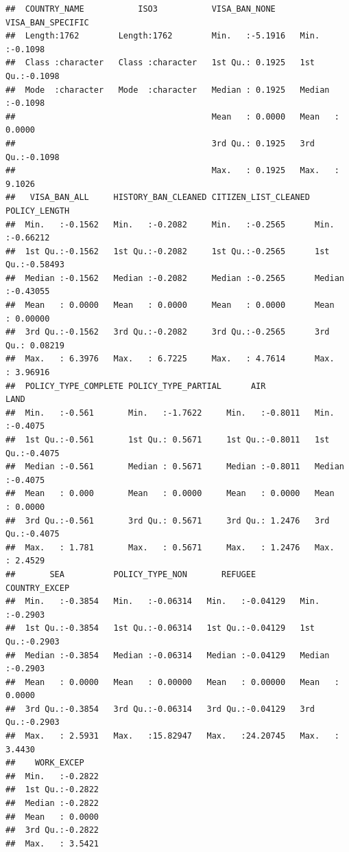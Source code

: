 \documentclass[]{article}
\begin{document}
\begin{verbatim}
##  COUNTRY_NAME           ISO3           VISA_BAN_NONE     VISA_BAN_SPECIFIC
##  Length:1762        Length:1762        Min.   :-5.1916   Min.   :-0.1098  
##  Class :character   Class :character   1st Qu.: 0.1925   1st Qu.:-0.1098  
##  Mode  :character   Mode  :character   Median : 0.1925   Median :-0.1098  
##                                        Mean   : 0.0000   Mean   : 0.0000  
##                                        3rd Qu.: 0.1925   3rd Qu.:-0.1098  
##                                        Max.   : 0.1925   Max.   : 9.1026  
##   VISA_BAN_ALL     HISTORY_BAN_CLEANED CITIZEN_LIST_CLEANED POLICY_LENGTH     
##  Min.   :-0.1562   Min.   :-0.2082     Min.   :-0.2565      Min.   :-0.66212  
##  1st Qu.:-0.1562   1st Qu.:-0.2082     1st Qu.:-0.2565      1st Qu.:-0.58493  
##  Median :-0.1562   Median :-0.2082     Median :-0.2565      Median :-0.43055  
##  Mean   : 0.0000   Mean   : 0.0000     Mean   : 0.0000      Mean   : 0.00000  
##  3rd Qu.:-0.1562   3rd Qu.:-0.2082     3rd Qu.:-0.2565      3rd Qu.: 0.08219  
##  Max.   : 6.3976   Max.   : 6.7225     Max.   : 4.7614      Max.   : 3.96916  
##  POLICY_TYPE_COMPLETE POLICY_TYPE_PARTIAL      AIR               LAND        
##  Min.   :-0.561       Min.   :-1.7622     Min.   :-0.8011   Min.   :-0.4075  
##  1st Qu.:-0.561       1st Qu.: 0.5671     1st Qu.:-0.8011   1st Qu.:-0.4075  
##  Median :-0.561       Median : 0.5671     Median :-0.8011   Median :-0.4075  
##  Mean   : 0.000       Mean   : 0.0000     Mean   : 0.0000   Mean   : 0.0000  
##  3rd Qu.:-0.561       3rd Qu.: 0.5671     3rd Qu.: 1.2476   3rd Qu.:-0.4075  
##  Max.   : 1.781       Max.   : 0.5671     Max.   : 1.2476   Max.   : 2.4529  
##       SEA          POLICY_TYPE_NON       REFUGEE         COUNTRY_EXCEP    
##  Min.   :-0.3854   Min.   :-0.06314   Min.   :-0.04129   Min.   :-0.2903  
##  1st Qu.:-0.3854   1st Qu.:-0.06314   1st Qu.:-0.04129   1st Qu.:-0.2903  
##  Median :-0.3854   Median :-0.06314   Median :-0.04129   Median :-0.2903  
##  Mean   : 0.0000   Mean   : 0.00000   Mean   : 0.00000   Mean   : 0.0000  
##  3rd Qu.:-0.3854   3rd Qu.:-0.06314   3rd Qu.:-0.04129   3rd Qu.:-0.2903  
##  Max.   : 2.5931   Max.   :15.82947   Max.   :24.20745   Max.   : 3.4430  
##    WORK_EXCEP     
##  Min.   :-0.2822  
##  1st Qu.:-0.2822  
##  Median :-0.2822  
##  Mean   : 0.0000  
##  3rd Qu.:-0.2822  
##  Max.   : 3.5421
\end{verbatim}
\end{document}
